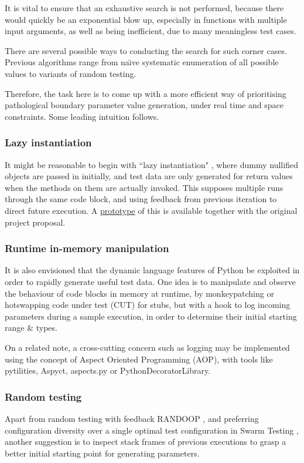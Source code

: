 \documentclass{icldt}
\numberwithin{equation}{section}       %
\def\naive{na\"{\i}ve }
\begin{document}
It is vital to ensure that an exhaustive search is not performed, because there would quickly be an exponential blow up, especially in functions with multiple input arguments, as well as being inefficient, due to many meaningless test cases.

There are several possible ways to conducting the search for such corner cases. Previous algorithms range from \naive systematic enumeration of all possible values to variants of random testing.

Therefore, the task here is to come up with a more efficient way of prioritising pathological boundary parameter value generation, under real time and space constraints. Some leading intuition follows.
\subsubsection{Lazy instantiation}
It might be reasonable to begin with ``lazy instantiation" \cite{Allwood2011}, where dummy nullified objects are passed in initially, and test data are only generated for return values when the methods on them are actually invoked. This supposes multiple runs through the same code block, and using feedback from previous iteration to direct future execution. A \href{https://github.com/evandrix/Pyrulan}{prototype} of this is available together with the original project proposal.

\subsubsection{Runtime in-memory manipulation}
It is also envisioned that the dynamic language features of Python be exploited in order to rapidly generate useful test data. One idea is to manipulate and observe the behaviour of code blocks in memory at runtime, by monkeypatching or hotswapping code under test (CUT) for stubs, but with a hook to log incoming parameters during a sample execution, in order to determine their initial starting range \& types.

On a related note, a cross-cutting concern such as logging may be implemented using the concept of Aspect Oriented Programming (AOP), with tools like pytilities, Aspyct, aspects.py or PythonDecoratorLibrary.

\subsubsection{Random testing}
Apart from random testing with feedback RANDOOP \cite{Pacheco2007}, and preferring configuration diversity over a single optimal test configuration in Swarm Testing \cite{AlexGroceSep2011}, another suggestion is to inspect stack frames of previous executions to grasp a better initial starting point for generating parameters.
\end{document}
